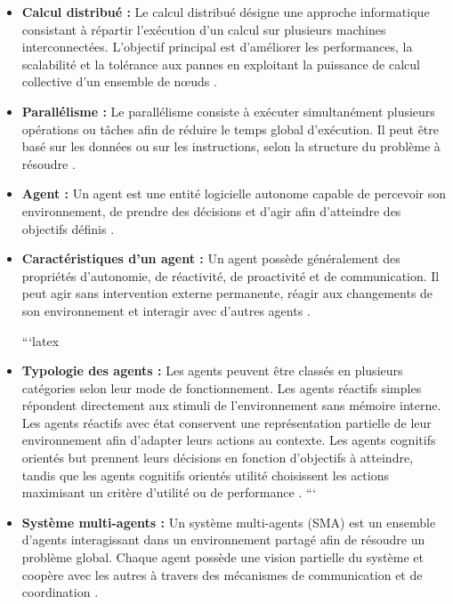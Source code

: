 \documentclass[12pt,a4paper]{report}
\begin{document}
\begin{itemize}

    \item[$\bullet$] \textbf{Calcul distribué :} Le calcul distribué désigne une approche informatique consistant à répartir l’exécution d’un calcul sur plusieurs machines interconnectées. L’objectif principal est d’améliorer les performances, la scalabilité et la tolérance aux pannes en exploitant la puissance de calcul collective d’un ensemble de nœuds \cite{tanenbaum_ds}.

    \item[$\bullet$] \textbf{Parallélisme :} Le parallélisme consiste à exécuter simultanément plusieurs opérations ou tâches afin de réduire le temps global d’exécution. Il peut être basé sur les données ou sur les instructions, selon la structure du problème à résoudre \cite{tanenbaum_ds}.

    \item[$\bullet$] \textbf{Agent :} Un agent est une entité logicielle autonome capable de percevoir son environnement, de prendre des décisions et d’agir afin d’atteindre des objectifs définis \cite{wooldridge, ferber}.

    \item[$\bullet$] \textbf{Caractéristiques d’un agent :} Un agent possède généralement des propriétés d’autonomie, de réactivité, de proactivité et de communication. Il peut agir sans intervention externe permanente, réagir aux changements de son environnement et interagir avec d’autres agents \cite{wooldridge, ferber}.

 ```latex
\item[$\bullet$] \textbf{Typologie des agents :} Les agents peuvent être classés en plusieurs catégories selon leur mode de fonctionnement. Les agents réactifs simples répondent directement aux stimuli de l’environnement sans mémoire interne. Les agents réactifs avec état conservent une représentation partielle de leur environnement afin d’adapter leurs actions au contexte. Les agents cognitifs orientés but prennent leurs décisions en fonction d’objectifs à atteindre, tandis que les agents cognitifs orientés utilité choisissent les actions maximisant un critère d’utilité ou de performance \cite{russellnorvig, ferber}.
```


    \item[$\bullet$] \textbf{Système multi-agents :} Un système multi-agents (SMA) est un ensemble d’agents interagissant dans un environnement partagé afin de résoudre un problème global. Chaque agent possède une vision partielle du système et coopère avec les autres à travers des mécanismes de communication et de coordination \cite{ferber, wooldridge}.


\end{itemize}
\end{document}
